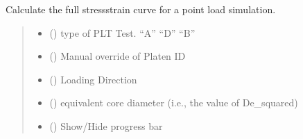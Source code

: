 \documentclass[letterpaper,10pt,english]{sphinxmanual}
\begin{document}
\begin{fulllineitems}
\begin{fulllineitems}
\label{\detokenize{openfdem:openfdem.openfdem.Model.complete_PLT_stress_strain}}
\pysigstartsignatures
{}
\pysigstopsignatures
\sphinxAtStartPar
Calculate the full stress\sphinxhyphen{}strain curve for a point load simulation.
\begin{quote}\begin{description}
\begin{itemize}
\item {} 
\sphinxAtStartPar
{} () \textendash{} type of PLT Test. “A” “D” “B”

\item {} 
\sphinxAtStartPar
{} () \textendash{} Manual override of Platen ID

\item {} 
\sphinxAtStartPar
{} () \textendash{} Loading Direction

\item {} 
\sphinxAtStartPar
{} () \textendash{} equivalent core diameter (i.e., the value of De\_squared)

\item {} 
\sphinxAtStartPar
{} () \textendash{} Show/Hide progress bar

\end{itemize}


\end{description}
\end{quote}
\end{fulllineitems}
\end{fulllineitems}
\end{document}
